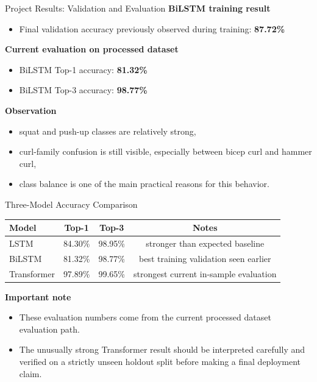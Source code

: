 \documentclass[aspectratio=169]{beamer}
\begin{document}
\begin{frame}{Project Results: Validation and Evaluation}
\small
\textbf{BiLSTM training result}
\begin{itemize}
  \item Final validation accuracy previously observed during training: \textbf{87.72\%}
\end{itemize}

\textbf{Current evaluation on processed dataset}
\begin{itemize}
  \item BiLSTM Top-1 accuracy: \textbf{81.32\%}
  \item BiLSTM Top-3 accuracy: \textbf{98.77\%}
\end{itemize}

\textbf{Observation}
\begin{itemize}
  \item squat and push-up classes are relatively strong,
  \item curl-family confusion is still visible, especially between bicep curl and hammer curl,
  \item class balance is one of the main practical reasons for this behavior.
\end{itemize}
\end{frame}

\begin{frame}{Three-Model Accuracy Comparison}
\small
\begin{tabular}{p{3.0cm} c c c}
\toprule
\textbf{Model} & \textbf{Top-1} & \textbf{Top-3} & \textbf{Notes} \\
\midrule
LSTM & 84.30\% & 98.95\% & stronger than expected baseline \\
BiLSTM & 81.32\% & 98.77\% & best training validation seen earlier \\
Transformer & 97.89\% & 99.65\% & strongest current in-sample evaluation \\
\bottomrule
\end{tabular}

\vspace{0.3cm}
\textbf{Important note}
\begin{itemize}
  \item These evaluation numbers come from the current processed dataset evaluation path.
  \item The unusually strong Transformer result should be interpreted carefully and verified on a strictly unseen holdout split before making a final deployment claim.
\end{itemize}
\end{frame}
\end{document}
